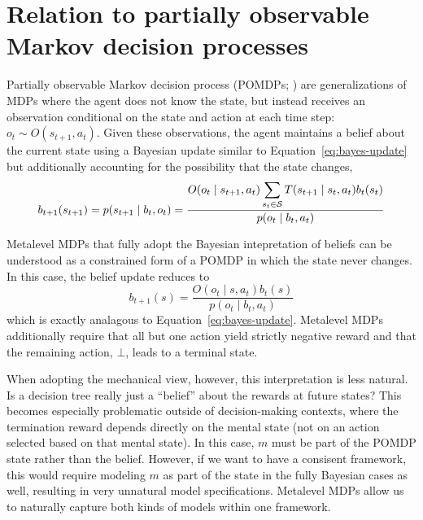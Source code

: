 \section{Relation to partially observable Markov decision processes}


Partially observable Markov decision process (POMDPs; \citealp{kaelbling1998planningbb}) are generalizations of MDPs where the agent does not know the state, but instead receives an observation conditional on the state and action at each time step: $o_t \sim O(s_{t+1}, a_t)$. Given these observations, the agent maintains a belief about the current state using a Bayesian update similar to Equation~\ref{eq:bayes-update} but additionally accounting for the possibility that the state changes,
%
\begin{equation}\label{eq:pomdp-update}
  b_{t+1}(s_{t+1}) = p(s_{t+1} \mid b_t, o_t) = \frac{
    O(o_t \mid s_{t+1}, a_t) \displaystyle\sum_{s_t \in \S} T(s_{t+1} \mid s_t, a_t) b_t(s_t)
  }{
    p(o_t \mid b_t, a_t)
  } 
\end{equation}
%

Metalevel MDPs that fully adopt the Bayesian intepretation of beliefs can be understood as a constrained form of a POMDP in which the state never changes. In this case, the belief update reduces to
\begin{equation}\label{eq:pomdp-update}
  b_{t+1}(s) =  
  \frac{O(o_t \mid s, a_t) b_t(s)}{p(o_t \mid b_t, a_t)}
\end{equation}
which is exactly analagous to Equation~\ref{eq:bayes-update}.
Metalevel MDPs additionally require that all but one action yield strictly negative reward and that the remaining action, $\bot$, leads to a terminal state.

When adopting the mechanical view, however, this interpretation is less natural. Is a decision tree really just a ``belief'' about the rewards at future states? This becomes especially problematic outside of decision-making contexts, where the termination reward depends directly on the mental state (not on an action selected based on that mental state). In this case, $m$ must be part of the POMDP state rather than the belief. However, if we want to have a consisent framework, this would require modeling $m$ as part of the state in the fully Bayesian cases as well, resulting in very unnatural model specifications. Metalevel MDPs allow us to naturally capture both kinds of models within one framework.

